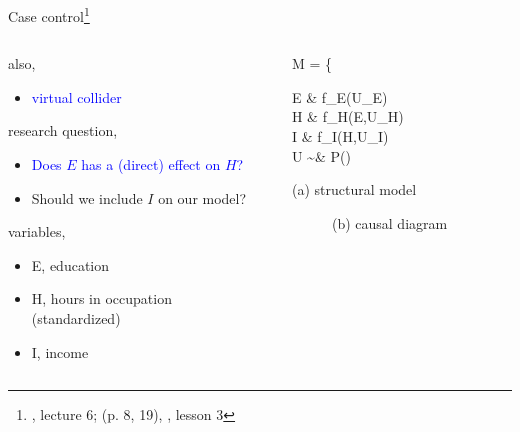 \begin{frame}
	{Case control\footnote{\citet{McElreath_2022}, lecture 6; \citet{Cinelli_et_al_2021} (p. 8, 19), \citet{Hernan_2020}, lesson 3}}
	\begin{columns}
		\begin{column}{0.5\textwidth}
			also, 
			\begin{itemize}
				\item \textcolor{blue}{virtual collider}
			\end{itemize}
			
			research question, 
			\begin{itemize}
				\item \textcolor{blue}{Does $E$ has a (direct) effect on $H$?}
				\item Should we include $I$ on our model?
			\end{itemize}
			
			variables,
			\begin{itemize}
				\item E, education 
				\item H, hours in occupation \\
				{\small (standardized)}
				\item I, income
			\end{itemize}
		\end{column}
		\begin{column}{0.5\textwidth}  
			\begin{equ}
				M = \left\{ \begin{aligned} 
					E \leftarrow & \; f_{E}(U_{E}) \\
					H \leftarrow & \; f_{H}(E,U_{H}) \\
					I \leftarrow & \; f_{I}(H,U_{I}) \\
					U \sim & \; P()
				\end{aligned} \right
				\caption*{(a) structural model}
			\end{equ}
			\begin{figure}
				\caption*{(b) causal diagram}
			\end{figure}
		\end{column}
	\end{columns}
\end{frame}

